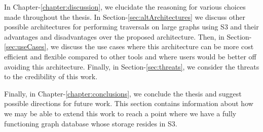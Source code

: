 \medskip
In Chapter-\ref{chapter:discussion}, we elucidate the reasoning for various choices
made throughout the thesis.
In Section-\ref{sec:altArchitectures} we discuss other possible architectures for
performing traversals on large graphs using S3 and their advantages and
disadvantages over the proposed architecture. Then, in
Section-\ref{sec:useCases}, we discuss the use cases where this architecture
can be more cost efficient and flexible compared to other tools and where users
would be better off avoiding this architecture. Finally, in
Section-\ref{sec:threats}, we consider the threats to the credibility of this
work.

\medskip
Finally, in Chapter-\ref{chapter:conclusions}, we conclude the thesis and
suggest possible directions for future work. This section contains information
about how we may be able to extend this work to reach a point where we have a
fully functioning graph database whose storage resides in S3.
